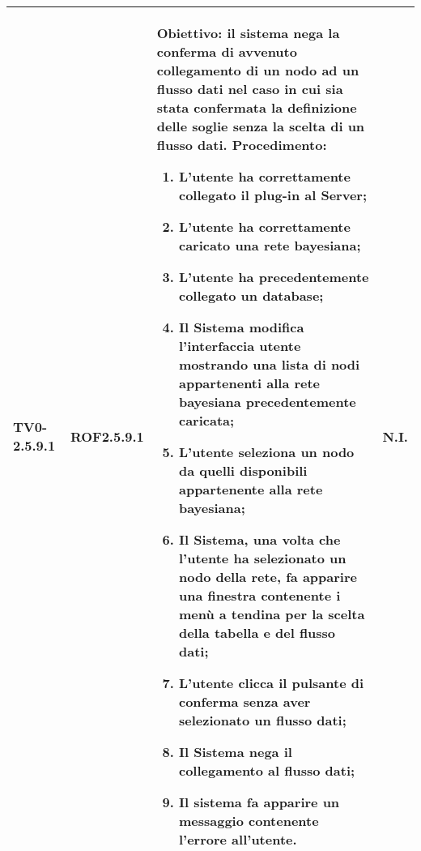 \begin{longtable}{|C{.15\textwidth}|C{.13\textwidth}|m{.52\textwidth}|C{.08\textwidth}|}
TV0-2.5.9.1 & ROF2.5.9.1  &
	\textbf{Obiettivo}: il sistema nega la conferma di avvenuto collegamento di un nodo ad un flusso dati nel caso in cui sia stata confermata la definizione delle soglie senza la scelta di un flusso dati. \newline
	\textbf{Procedimento}:
	\begin{enumerate}
		\item L'utente ha correttamente collegato il plug-in al Server;
		\item L'utente ha correttamente caricato una rete bayesiana;
		\item L'utente ha precedentemente collegato un database;
		\item Il Sistema modifica l'interfaccia utente mostrando una lista di nodi appartenenti alla rete bayesiana precedentemente caricata;
		\item L'utente seleziona un nodo da quelli disponibili appartenente alla rete bayesiana;
		\item Il Sistema, una volta che l'utente ha selezionato un nodo della rete, fa apparire una finestra contenente i menù a tendina per la scelta della tabella e del flusso dati;
		\item L'utente clicca il pulsante di conferma senza aver selezionato un flusso dati;
		\item Il Sistema nega il collegamento al flusso dati;
		\item Il sistema fa apparire un messaggio contenente l'errore all'utente.
	\end{enumerate}
	& N.I. \\
\hline


\end{longtable}
